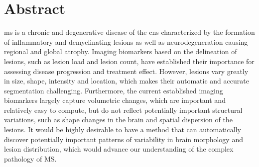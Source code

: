 \chapter*{Abstract}




\Gls{ms} is a chronic and degenerative disease of the \gls{cns} characterized by
the formation of inflammatory and demyelinating lesions as well as
neurodegeneration causing regional and global atrophy. Imaging biomarkers based
on the delineation of lesions, such as lesion load and lesion count, have
established their importance for assessing disease progression and treatment
effect. However, lesions vary greatly in size, shape, intensity and location,
which makes their automatic and accurate segmentation challenging. Furthermore,
the current established imaging biomarkers largely capture volumetric changes,
which are important and relatively easy to compute, but do not reflect
potentially important structural variations, such as shape changes in the brain
and spatial dispersion of the lesions. It would be highly desirable to have a
method that can automatically discover potentially important patterns of
variability in brain morphology and lesion distribution, which would advance our
understanding of the complex pathology of MS.


